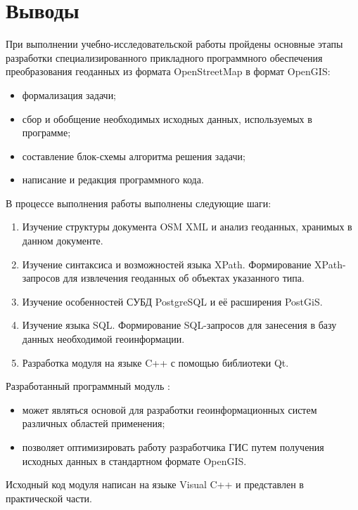 \documentclass[12pt,a4paper,oneside]{article} %
\begin{document}
\section{Выводы}
При выполнении учебно-исследовательской работы пройдены основные  \linebreak
этапы разработки специализированного прикладного программного  \linebreak
обеспечения преобразования геоданных из формата OpenStreetMap  \linebreak
в формат OpenGIS:
\begin{itemize}
\item формализация задачи;
\item сбор и обобщение необходимых исходных данных, используемых в \linebreak
программе;
\item составление блок-схемы алгоритма решения задачи;
\item написание и редакция программного кода.
\end{itemize}
В процессе выполнения работы выполнены следующие шаги:
\begin{enumerate}
\item Изучение структуры документа OSM XML и анализ геоданных, \linebreak
хранимых в данном документе.
\item Изучение синтаксиса и возможностей языка XPath. Формирование \linebreak
XPath-запросов для извлечения геоданных об объектах указанного типа.
\item Изучение особенностей СУБД PostgreSQL и её расширения PostGiS.
\item Изучение языка SQL. Формирование SQL-запросов для занесения в \linebreak
базу данных необходимой геоинформации.
\item Разработка модуля на языке C++ с помощью библиотеки Qt.
\end{enumerate}
Разработанный программный модуль :
\begin{itemize}
\item может являться основой для разработки геоинформационных систем \linebreak
различных областей применения;
\item позволяет оптимизировать работу разработчика ГИС путем получения \linebreak
исходных данных в стандартном формате OpenGIS.
\end{itemize}
Исходный код модуля написан на языке Visual C++ и представлен в \linebreak
практической части.
\end{document}
